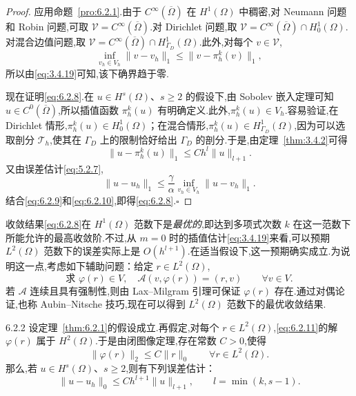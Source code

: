\begin{proof}
应用命题~\ref{pro:6.2.1}.由于 \(C^\infty(\overline\Omega)\) 在 \(H^1(\Omega)\) 中稠密,对 Neumann 问题和 Robin 问题,可取 \(\mathcal V=C^\infty(\overline\Omega)\).对 Dirichlet 问题,取 \(\mathcal V=C^\infty(\overline\Omega)\cap H_0^1(\Omega)\).对混合边值问题,取 \(\mathcal V=C^\infty(\overline\Omega)\cap H^1_{\Gamma_D}(\Omega)\).此外,对每个 \(v\in\mathcal V\),
\[
  \inf_{v_h\in V_h}\|v-v_h\|_1\le\|v-\pi_h^k(v)\|_1,
\]
所以由\eqref{eq:3.4.19}可知,该下确界趋于零.

现在证明\eqref{eq:6.2.8}.在 \(u\in H^s(\Omega)\)、\(s\ge2\) 的假设下,由 Sobolev 嵌入定理可知 \(u\in C^0(\overline\Omega)\),所以插值函数 \(\pi_h^k(u)\) 有明确定义.此外,\(\pi_h^k(u)\in V_h\).容易验证,在 Dirichlet 情形,\(\pi_h^k(u)\in H_0^1(\Omega)\)；在混合情形,\(\pi_h^k(u)\in H^1_{\Gamma_D}(\Omega)\),因为可以选取剖分 \(\mathcal T_h\),使其在 \(\Gamma_D\) 上的限制恰好给出 \(\Gamma_D\) 的剖分.于是,由定理~\ref{thm:3.4.2}可得
\begin{equation}\label{eq:6.2.9}
  \|u-\pi_h^k(u)\|_1\le Ch^l\|u\|_{l+1}.
\end{equation}
又由误差估计\eqref{eq:5.2.7},
\begin{equation}\label{eq:6.2.10}
  \|u-u_h\|_1\le\frac\gamma\alpha\inf_{v_h\in V_h}\|u-v_h\|_1.
\end{equation}
结合\eqref{eq:6.2.9}和\eqref{eq:6.2.10},即得\eqref{eq:6.2.8}.\hfill\(\square\)
\end{proof}

收敛结果\eqref{eq:6.2.8}在 \(H^1(\Omega)\) 范数下是\emph{最优的},即达到多项式次数 \(k\) 在这一范数下所能允许的最高收敛阶.不过,从 \(m=0\) 时的插值估计\eqref{eq:3.4.19}来看,可以预期 \(L^2(\Omega)\) 范数下的误差实际上是 \(O(h^{l+1})\).在适当假设下,这一预期确实成立.为说明这一点,考虑如下辅助问题：给定 \(r\in L^2(\Omega)\),
\begin{equation}\label{eq:6.2.11}
  \text{求 }\varphi(r)\in V,\quad \mathcal A(v,\varphi(r))=(r,v)\qquad\forall v\in V.
\end{equation}
若 \(\mathcal A\) 连续且具有强制性,则由 Lax--Milgram 引理可保证 \(\varphi(r)\) 存在.通过对偶论证,也称 Aubin--Nitsche 技巧,现在可以得到 \(L^2(\Omega)\) 范数下的最优收敛结果.

\begin{proposition}[]{6.2.2}
设定理~\ref{thm:6.2.1}的假设成立.再假定,对每个 \(r\in L^2(\Omega)\),\eqref{eq:6.2.11}的解 \(\varphi(r)\) 属于 \(H^2(\Omega)\).于是由闭图像定理,存在常数 \(C>0\),使得
\begin{equation}\label{eq:6.2.12}
  \|\varphi(r)\|_2\le C\|r\|_0\qquad\forall r\in L^2(\Omega).
\end{equation}
那么,若 \(u\in H^s(\Omega)\)、\(s\ge2\),则有下列误差估计：
\begin{equation}\label{eq:6.2.13}
  \|u-u_h\|_0\le Ch^{l+1}\|u\|_{l+1},\qquad l=\min(k,s-1).
\end{equation}
\end{proposition}

